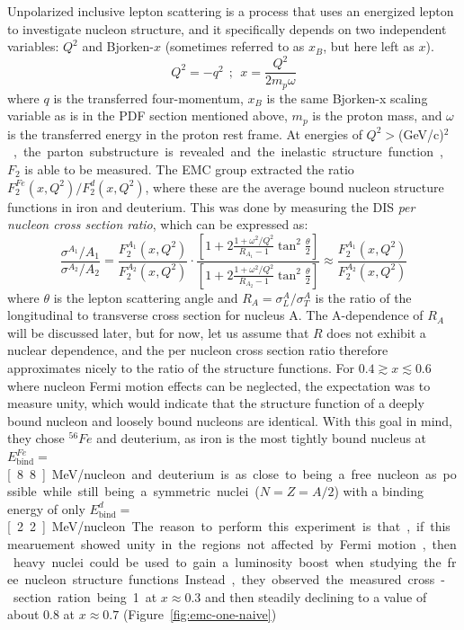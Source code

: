 Unpolarized inclusive lepton scattering is a process that uses an energized lepton to investigate nucleon structure, and it specifically depends on two independent variables: $Q^2$ and Bjorken-$x$ (sometimes referred to as $x_B$, but here left as $x$).
\begin{equation}
	Q^2 = -q^2\ \ ;\ \ x = \frac{Q^2}{2 m_p \omega}
\end{equation}
where $q$ is the transferred four-momentum, $x_B$ is the same Bjorken-x scaling variable as is in the PDF section mentioned above, $m_p$ is the proton mass, and $\omega$ is the transferred energy in the proton rest frame. At energies of $Q^2>$\unit[2]{(GeV/c)$^2$}, the parton substructure is revealed and the inelastic structure function, $F_2$ is able to be measured. The EMC group extracted the ratio $F_2^{Fe}(x,Q^2)/F_2^{d}(x,Q^2)$, where these are the average bound nucleon structure functions in iron and deuterium. This was done by measuring the DIS \emph{per nucleon cross section ratio}, which can be expressed as\cite{Halzen:1984mc}:
\begin{equation}
\frac{\sigma^{A_1}/A_1}{\sigma^{A_2}/A_2} = \frac{F_2^{A_1}(x, Q^2)}{F_2^{A_2}(x, Q^2)} \cdot \frac{\left[ 1 + 2\frac{1+\omega^2/Q^2}{R_{A_1}-1}\tan^2\frac{\theta}{2} \right]}{\left[ 1 + 2\frac{1+\omega^2/Q^2}{R_{A_2}-1}\tan^2\frac{\theta}{2} \right]} \approx \frac{F_2^{A_1}(x, Q^2)}{F_2^{A_2}(x, Q^2)}
\end{equation}
where $\theta$ is the lepton scattering angle and $R_A=\sigma^A_L/\sigma^A_T$ is the ratio of the longitudinal to transverse cross section for nucleus A. The A-dependence of $R_A$ will be discussed later, but for now, let us assume that $R$ does not exhibit a nuclear dependence, and the per nucleon cross section ratio therefore approximates nicely to the ratio of the structure functions. For $0.4\gtrsim x\lesssim0.6$ where nucleon Fermi motion effects can be neglected, the expectation was to measure unity, which would indicate that the structure function of a deeply bound nucleon and loosely bound nucleons are identical. With this goal in mind, they chose $^{56}Fe$ and deuterium, as iron is the most tightly bound nucleus at $E^{Fe}_{\text{bind}}=$\unit[8.8]{MeV/nucleon} and deuterium is as close to being a free nucleon as possible while still being a symmetric nuclei ($N=Z=A/2$) with a binding energy of only $E^{d}_{\text{bind}}=$\unit[2.2]{MeV/nucleon}. The reason to perform this experiment is that, if this mearuement showed unity in the regions not affected by Fermi motion, then heavy nuclei could be used to gain a luminosity boost when studying the free nucleon structure functions. Instead, they observed the measured cross-section ration being 1 at $x\approx 0.3$ and then steadily declining to a value of about 0.8 at $x\approx0.7$ (Figure~\ref{fig:emc-one-naive})	
	
